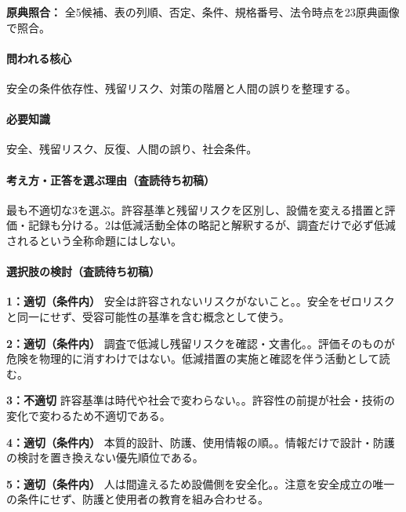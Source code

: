 \noindent\textbf{原典照合：} 全5候補、表の列順、否定、条件、規格番号、法令時点を23原典画像で照合。\par

\paragraph{問われる核心} 安全の条件依存性、残留リスク、対策の階層と人間の誤りを整理する。

\paragraph{必要知識} 安全、残留リスク、反復、人間の誤り、社会条件。

\paragraph{考え方・正答を選ぶ理由（査読待ち初稿）} 最も不適切な3を選ぶ。許容基準と残留リスクを区別し、設備を変える措置と評価・記録も分ける。2は低減活動全体の略記と解釈するが、調査だけで必ず低減されるという全称命題にはしない。

\paragraph{選択肢の検討（査読待ち初稿）}\mbox{}\par

\noindent\textbf{1：適切（条件内）} 安全は許容されないリスクがないこと。。安全をゼロリスクと同一にせず、受容可能性の基準を含む概念として使う。\par

\noindent\textbf{2：適切（条件内）} 調査で低減し残留リスクを確認・文書化。。評価そのものが危険を物理的に消すわけではない。低減措置の実施と確認を伴う活動として読む。\par

\noindent\textbf{3：不適切} 許容基準は時代や社会で変わらない。。許容性の前提が社会・技術の変化で変わるため不適切である。\par

\noindent\textbf{4：適切（条件内）} 本質的設計、防護、使用情報の順。。情報だけで設計・防護の検討を置き換えない優先順位である。\par

\noindent\textbf{5：適切（条件内）} 人は間違えるため設備側を安全化。。注意を安全成立の唯一の条件にせず、防護と使用者の教育を組み合わせる。\par

